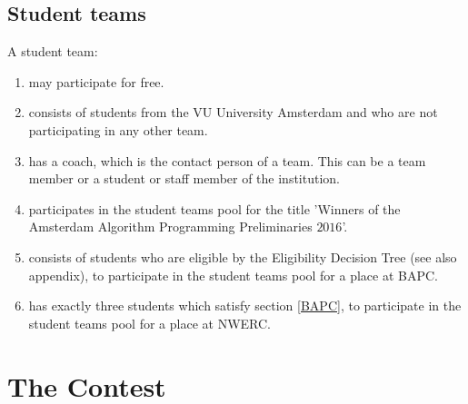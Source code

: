 \documentclass[11pt]{report}
\begin{document}
\section{Student teams}
A student team:
\begin{enumerate}[label=\bfseries 3.1.\arabic*]
\item may participate for free.
\item consists of students from the VU University Amsterdam and who are not participating in any other team.
\item has a coach, which is the contact person of a team. This can be a team member or a student or staff member of the institution.
\item participates in the student teams pool for the title 'Winners of the Amsterdam Algorithm Programming Preliminaries $2016$'.
\item \label{BAPC} consists of students who are eligible by the Eligibility Decision Tree (see also appendix), to participate in the student teams pool for a place at BAPC.
\item \label{NWERC} has exactly three students which satisfy section \ref{BAPC}, to participate in the student teams pool for a place at NWERC.
\end{enumerate}


\chapter{The Contest}
\end{document}
